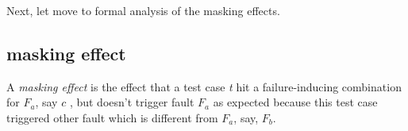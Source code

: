 \documentclass{sig-alternate}
\begin{document}




Next, let move to formal analysis of the masking effects.

\subsection{masking effect}

\begin{definition}
A \emph{masking effect} is the effect that a test case \emph{t} hit a failure-inducing combination for $F_{a}$, say $c$ , but doesn't trigger fault $F_{a}$ as expected because this test case triggered other fault which is different from $F_{a}$, say, $F_{b}$.

\end{definition}
\end{document}
